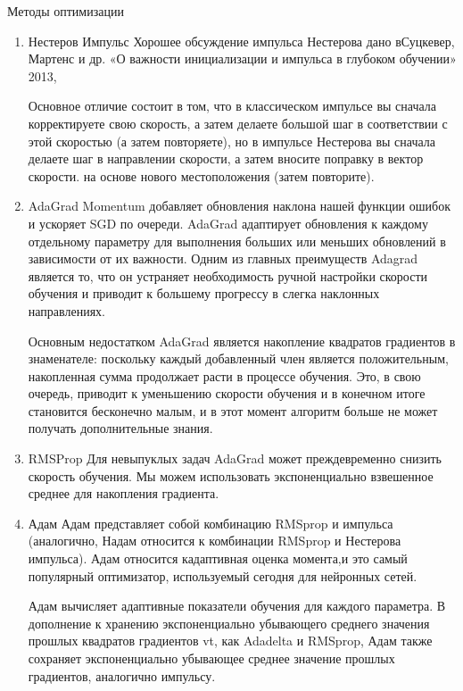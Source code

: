 \documentclass[12pt,a4paper]{report}
\begin{document}
Методы оптимизации
\begin{enumerate}
	\item Нестеров Импульс
	Хорошее обсуждение импульса Нестерова дано вСуцкевер, Мартенс и др. «О важности инициализации и импульса в глубоком обучении» 2013,

	Основное отличие состоит в том, что в классическом импульсе вы сначала корректируете свою скорость, а затем делаете большой шаг в соответствии с этой 		скоростью (а затем повторяете), но в импульсе Нестерова вы сначала делаете шаг в направлении скорости, а затем вносите поправку в вектор скорости. на основе 	     нового местоположения (затем повторите).
	\item AdaGrad
	Momentum добавляет обновления наклона нашей функции ошибок и ускоряет SGD по очереди. AdaGrad адаптирует обновления к каждому отдельному параметру для 		выполнения больших или меньших обновлений в зависимости от их важности.
	Одним из главных преимуществ Adagrad является то, что он устраняет необходимость ручной настройки скорости обучения и приводит к большему прогрессу в слегка 	     наклонных направлениях.

	Основным недостатком AdaGrad является накопление квадратов градиентов в знаменателе: поскольку каждый добавленный член является положительным, накопленная 	   сумма продолжает расти в процессе обучения. Это, в свою очередь, приводит к уменьшению скорости обучения и в конечном итоге становится бесконечно малым, и в  	 этот 	момент алгоритм больше не может получать дополнительные знания.
	\item RMSProp
	Для невыпуклых задач AdaGrad может преждевременно снизить скорость обучения. Мы можем использовать экспоненциально взвешенное среднее для накопления 		градиента.
	\item Адам
	Адам представляет собой комбинацию RMSprop и импульса (аналогично, Надам относится к комбинации RMSprop и Нестерова импульса). Адам относится кадаптивная 	  оценка момента,и это самый популярный оптимизатор, используемый сегодня для нейронных сетей.

	Адам вычисляет адаптивные показатели обучения для каждого параметра. В дополнение к хранению экспоненциально убывающего среднего значения прошлых квадратов 	    градиентов vt, как Adadelta и RMSprop, Адам также сохраняет экспоненциально убывающее среднее значение прошлых градиентов, аналогично импульсу. 
\end{enumerate}
\end{document}
